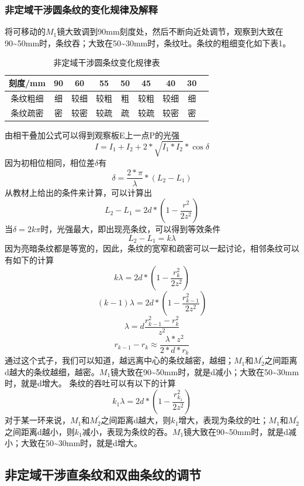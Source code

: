 \documentclass[a4paper,11pt]{article}
\begin{document}
\subsubsection{非定域干涉圆条纹的变化规律及解释}
    将可移动的$M_{1}$镜大致调到90mm刻度处，然后不断向近处调节，观察到大致在90\~{}50mm时，条纹吞；大致在50\~{}30mm时，条纹吐。条纹的粗细变化如下表1。
    \begin{table}[H]
    	\centering\caption{非定域干涉圆条纹变化规律表}
    	\small
    	\begin{tabularx}{.85\linewidth}{C{1} *8{C{.5}}}
    		\toprule
    		\textbf{刻度/mm} &
    		90 &
    		60 &
    		55 &
    		50 &
    		45 &
    		40 &
    		30 & \\
    		\midrule
    		条纹粗细     & 细  & 较细 & 较粗 &  粗 & 较粗 & 较细  & 细 \\
    		条纹疏密     & 密  & 较密 & 较疏 &  疏 & 较疏 & 较密  & 密 \\
    		\bottomrule
    	\end{tabularx}
    	\vspace{3ex}
    \end{table}\noindent%

    由相干叠加公式可以得到观察板E上一点P的光强$$ I = I_{1} + I_{2} + 2*\sqrt{I_{1}* I_{2}}* \cos\delta$$
    因为初相位相同，相位差$\delta$有$$\delta = \frac{2*\pi}{\lambda}*(L_{2}- L_{1})$$
    从教材上给出的条件来计算，可以计算出$$L_{2}- L_{1} = 2d*(1-\frac{r^2}{2z^2})$$
    当$\delta = 2k\pi$时，光强最大，即出现亮条纹，可以得到等效条件	$$ L_{2}- L_{1} = k\lambda $$
    因为亮暗条纹都是等宽的，因此，条纹的宽窄和疏密可以一起讨论，相邻条纹可以有如下的计算
    $$ k\lambda = 2d*(1-\frac{r_{k}^2}{2z^2}) $$
    $$ (k-1)\lambda = 2d*(1-\frac{r_{k-1}^2}{2z^2}) $$
    $$ \lambda = d\dfrac{r_{k-1}^2 - r_{k}^2}{z^2} $$
    $$ r_{k-1} - r_{k} \approx \dfrac{\lambda * z^2}{2*d*r_{k}} $$
    通过这个式子，我们可以知道，越远离中心的条纹越密，越细；$M_{1}$和$M_{2}^{\prime}$之间距离d越大的条纹越细，越密。$M_{1}$镜大致在90\~{}50mm时，就是d减小；大致在50\~{}30mm时，就是d增大。
    条纹的吞吐可以有以下的计算
    $$ k_{1}\lambda = 2d*(1-\frac{r_{k_{1}}^2}{2z^2}) $$
    对于某一环来说，$M_{1}$和$M_{2}^{\prime}$之间距离d越大，则$k_{1}$增大，表现为条纹的吐；$M_{1}$和$M_{2}^{\prime}$之间距离d越小，则$k_{1}$减小，表现为条纹的吞。$M_{1}$镜大致在90\~{}50mm时，就是d减小；大致在50\~{}30mm时，就是d增大。


\subsection{非定域干涉直条纹和双曲条纹的调节}
\end{document}
